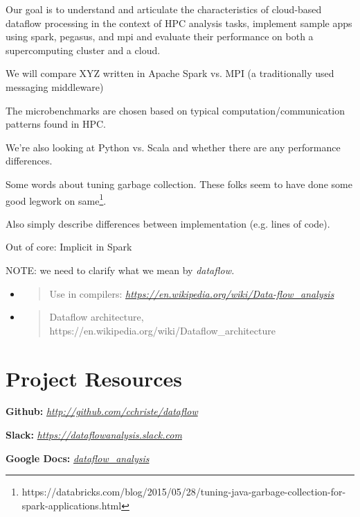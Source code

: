 \documentclass{sig-alternate}
\begin{document}
Our goal is to understand and articulate the characteristics of
cloud-based dataflow processing in the context of HPC analysis tasks,
implement sample apps using spark, pegasus, and mpi and evaluate their
performance on both a supercomputing cluster and a cloud.

We will compare XYZ written in Apache Spark vs. MPI (a traditionally
used messaging middleware)

The microbenchmarks are chosen based on typical
computation/communication patterns found in HPC.

We're also looking at Python vs. Scala and whether there are any
performance differences.

Some words about tuning garbage collection. These folks seem to have
done some good legwork on same\footnote{https://databricks.com/blog/2015/05/28/tuning-java-garbage-collection-for-spark-applications.html}.

Also simply describe differences between implementation (e.g. lines of
code).

Out of core: Implicit in Spark

NOTE: we need to clarify what we mean by \emph{dataflow.}

\begin{itemize}
\item
  \begin{quote}
  Use in compilers:
  \href{https://en.wikipedia.org/wiki/Data-flow_analysis}{\emph{https://en.wikipedia.org/wiki/Data-flow\_analysis}}
  \end{quote}
\item
  \begin{quote}
  Dataflow architecture,
  https://en.wikipedia.org/wiki/Dataflow\_architecture
  \end{quote}
\end{itemize}

\section{Project Resources}\label{project-resources}

\textbf{Github:}
\href{http://github.com/cchriste/dataflow}{\emph{http://github.com/cchriste/dataflow}}

\textbf{Slack:}
\href{https://dataflowanalysis.slack.com}{\emph{https://dataflowanalysis.slack.com}}

\textbf{Google Docs:}
\href{https://drive.google.com/folderview?id=0BxLkEMNd9q6FfmpRaFZXSGlPc0JsSDdVdndCUm83SzN6UnlLVEk5T3ZsZmJ0VEVGREtNTkE\&usp=sharing}{\emph{dataflow\_analysis}}
\end{document}
